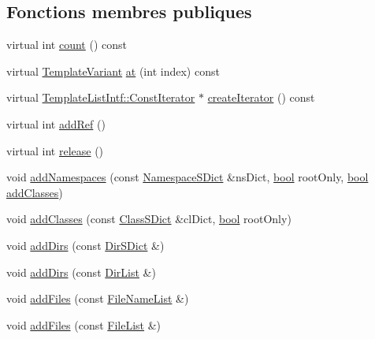 \subsection*{Fonctions membres publiques}
\begin{DoxyCompactItemize}
\item 
virtual int \hyperlink{class_nesting_context_ac5166b174fb93f0a905feefc4962cbad}{count} () const 
\item 
virtual \hyperlink{class_template_variant}{Template\+Variant} \hyperlink{class_nesting_context_a58d05d659b9ddd3ae68dba30205b138d}{at} (int index) const 
\item 
virtual \hyperlink{class_template_list_intf_1_1_const_iterator}{Template\+List\+Intf\+::\+Const\+Iterator} $\ast$ \hyperlink{class_nesting_context_adf3506a618869758eeba666db44f321f}{create\+Iterator} () const 
\item 
virtual int \hyperlink{class_nesting_context_a71b0b342e5bb1b434a0390a77640df55}{add\+Ref} ()
\item 
virtual int \hyperlink{class_nesting_context_a4f43acface7c31d6bb2aa3d9a9f2ea13}{release} ()
\item 
void \hyperlink{class_nesting_context_a0f51902303237dea662f7773633d1833}{add\+Namespaces} (const \hyperlink{class_namespace_s_dict}{Namespace\+S\+Dict} \&ns\+Dict, \hyperlink{qglobal_8h_a1062901a7428fdd9c7f180f5e01ea056}{bool} root\+Only, \hyperlink{qglobal_8h_a1062901a7428fdd9c7f180f5e01ea056}{bool} \hyperlink{class_nesting_context_ae520871daeb0cf070443873fefc2c3ed}{add\+Classes})
\item 
void \hyperlink{class_nesting_context_ae520871daeb0cf070443873fefc2c3ed}{add\+Classes} (const \hyperlink{class_class_s_dict}{Class\+S\+Dict} \&cl\+Dict, \hyperlink{qglobal_8h_a1062901a7428fdd9c7f180f5e01ea056}{bool} root\+Only)
\item 
void \hyperlink{class_nesting_context_a9ad1a2be0df92986ce455d836f9b72f0}{add\+Dirs} (const \hyperlink{class_dir_s_dict}{Dir\+S\+Dict} \&)
\item 
void \hyperlink{class_nesting_context_a512b12070aa7042bd1d21b75d5393897}{add\+Dirs} (const \hyperlink{class_dir_list}{Dir\+List} \&)
\item 
void \hyperlink{class_nesting_context_adda61f73cae330126a7172393797c6df}{add\+Files} (const \hyperlink{class_file_name_list}{File\+Name\+List} \&)
\item 
void \hyperlink{class_nesting_context_a9c2b94e274f88aa43230b3de7f7a1602}{add\+Files} (const \hyperlink{class_file_list}{File\+List} \&)
\item 

\end{DoxyCompactItemize}
